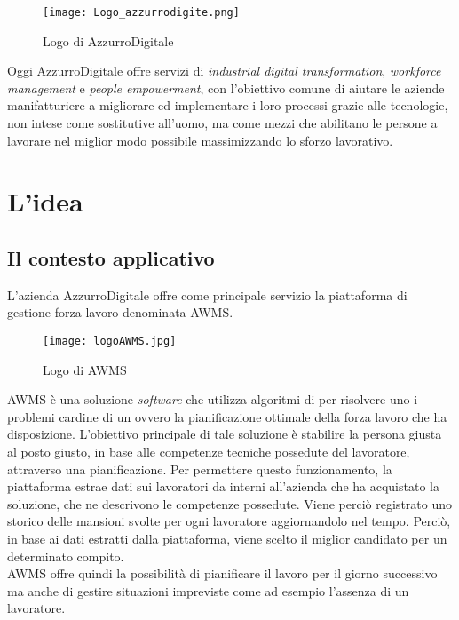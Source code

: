 \begin{figure}[h]
	\begin{center}
		\texttt{[image: Logo\_azzurrodigite.png]}
			\caption{Logo di AzzurroDigitale}
	\end{center}
\end{figure}
\pagebreak

Oggi AzzurroDigitale offre servizi di \emph{industrial digital transformation}, \emph{workforce management} e \emph{people empowerment}, con l'obiettivo comune di aiutare le aziende manifatturiere a migliorare ed implementare i loro processi grazie alle tecnologie, non intese come sostitutive all’uomo, ma come mezzi che abilitano le persone a lavorare nel miglior modo possibile massimizzando lo sforzo lavorativo.\\

\section{L'idea}

\subsection{Il contesto applicativo}
L'azienda AzzurroDigitale offre come principale servizio la piattaforma di gestione forza lavoro denominata \gls{AWMS}.\\
	\begin{figure}[!h] 
		\begin{center}
			\texttt{[image: logoAWMS.jpg]}
			\caption{Logo di AWMS}
		\end{center}
	\end{figure}

\gls{AWMS} è una soluzione \emph{software} che utilizza algoritmi di  per risolvere uno i problemi cardine di un  ovvero la pianificazione ottimale della forza lavoro che ha disposizione. L'obiettivo principale di tale soluzione è stabilire la persona giusta al posto giusto, in base alle competenze tecniche possedute del lavoratore, attraverso una pianificazione. Per permettere questo funzionamento, la piattaforma estrae dati sui lavoratori da  interni all'azienda che ha acquistato la soluzione, che ne descrivono le competenze possedute. Viene perciò registrato uno storico delle mansioni svolte per ogni lavoratore aggiornandolo nel tempo. Perciò, in base ai dati estratti dalla piattaforma, viene scelto il miglior candidato per un determinato compito. \\ \gls{AWMS} offre quindi la possibilità di pianificare il lavoro per il giorno successivo ma anche di gestire situazioni impreviste come ad esempio l'assenza di un lavoratore.

